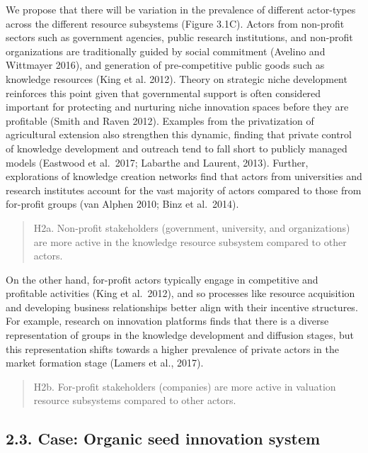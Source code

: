 \documentclass[twoside,12pt,final]{ucthesis-CA2012}
\begin{document}
\begin{ucmainmatter}
We propose that there will be variation in the prevalence of different
actor-types across the different resource subsystems (Figure 3.1C).
Actors from non-profit sectors such as government agencies, public
research institutions, and non-profit organizations are traditionally
guided by social commitment (Avelino and Wittmayer 2016), and generation
of pre-competitive public goods such as knowledge resources (King et al.
2012). Theory on strategic niche development reinforces this point given
that governmental support is often considered important for protecting
and nurturing niche innovation spaces before they are profitable (Smith
and Raven 2012). Examples from the privatization of agricultural
extension also strengthen this dynamic, finding that private control of
knowledge development and outreach tend to fall short to publicly
managed models (Eastwood et al.~2017; Labarthe and Laurent, 2013).
Further, explorations of knowledge creation networks find that actors
from universities and research institutes account for the vast majority
of actors compared to those from for-profit groups (van Alphen 2010;
Binz et al.~2014).
\begin{quote}
H2a. Non-profit stakeholders (government, university, and
organizations) are more active in the knowledge resource subsystem
compared to other actors.
\end{quote}
On the other hand, for-profit actors typically engage in competitive and
profitable activities (King et al.~2012), and so processes like resource
acquisition and developing business relationships better align with
their incentive structures. For example, research on innovation
platforms finds that there is a diverse representation of groups in the
knowledge development and diffusion stages, but this representation
shifts towards a higher prevalence of private actors in the market
formation stage (Lamers et al., 2017).
\begin{quote}
H2b. For-profit stakeholders (companies) are more active in valuation
resource subsystems compared to other actors.
\end{quote}
\hypertarget{case-organic-seed-innovation-system}{%
\subsection{2.3. Case: Organic seed innovation system}\label{case-organic-seed-innovation-system}}


\end{ucmainmatter}
\end{document}
